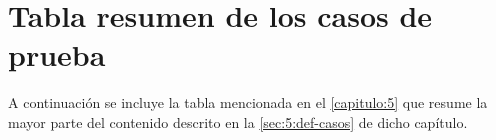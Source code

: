 \graphicspath{{anexos/AnexoD-Tabla-Casos/recursos/}}

\section{Tabla resumen de los casos de prueba} \label{Anexo:tabla-casos}

A continuación se incluye la tabla mencionada en el \autoref{capitulo:5} que resume la mayor parte del contenido descrito en la \autoref{sec:5:def-casos} de dicho capítulo. 

\begin{landscape}

\end{landscape}